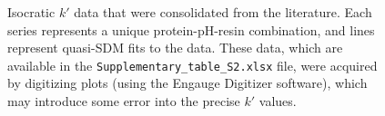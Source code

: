 \documentclass[11pt,a4paper]{article}
\begin{document}
\begin{figure}[H]
    \centering
    \vspace{-5.2cm}
    \vspace{-4cm}
    \caption{Isocratic $k'$ data that were consolidated from the literature. Each series represents a unique protein-pH-resin combination, and lines represent quasi-SDM fits to the data. These data, which are available in the \texttt{Supplementary\_table\_S2.xlsx} file, were acquired by digitizing plots (using the Engauge Digitizer software), which may introduce some error into the precise $k'$ values.}
    
    \label{fig:consolidated data}
\end{figure}
\end{document}
